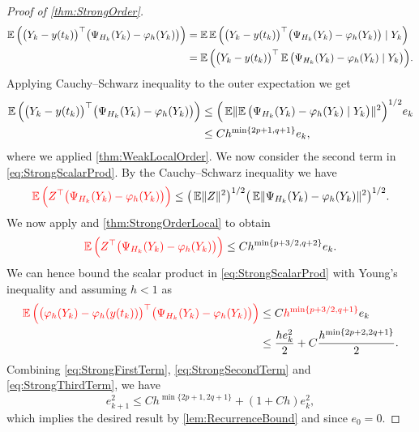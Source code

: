 \documentclass[10pt]{article}
\begin{document}
\begin{proof}[Proof of \cref{thm:StrongOrder}]
	\begin{equation}
	\begin{aligned}
		\operatorname{\mathbb{E}}\Big(\big(Y_k - y(t_k)\big)^\top \big(\Psi_{H_k}(Y_k) - \varphi_{h}(Y_k)\big)\Big) &= \operatorname{\mathbb{E}}\operatorname{\mathbb{E}}\Big(\big(Y_k - y(t_k)\big)^\top \big(\Psi_{H_k}(Y_k) - \varphi_{h}(Y_k)\big) \mid Y_k\Big)\\
		&= \operatorname{\mathbb{E}}\Big(\big(Y_k - y(t_k)\big)^\top\operatorname{\mathbb{E}} \big(\Psi_{H_k}(Y_k) - \varphi_{h}(Y_k) \mid Y_k \big)\Big).
	\end{aligned}
	\end{equation}
	Applying Cauchy--Schwarz inequality to the outer expectation we get
	\begin{equation}
	\begin{aligned}
		\operatorname{\mathbb{E}}\Big(\big(Y_k - y(t_k)\big)^\top \big(\Psi_{H_k}(Y_k) - \varphi_{h}(Y_k)\big)\Big) &\leq \Big(\operatorname{\mathbb{E}}\lVert\operatorname{\mathbb{E}}\big(\Psi_{H_k}(Y_k) - \varphi_{h}(Y_k) \mid Y_k\big)\rVert^{2}\Big)^{1/2}e_k  \\
		&\leq  Ch^{\min\{2p+1, q+1\}}e_k,
	\end{aligned}
	\end{equation}
	where we applied \cref{thm:WeakLocalOrder}. We now consider the second term in \eqref{eq:StrongScalarProd}. By the Cauchy--Schwarz inequality we have
	\begin{equation}
		{\color{red}\operatorname{\mathbb{E}}\Big(Z^\top \big(\Psi_{H_k}(Y_k) - \varphi_{h}(Y_k)\big)\Big)} \leq \big(\operatorname{\mathbb{E}}\lVert Z\rVert^{2}\big)^{1/2} \big(\operatorname{\mathbb{E}}\lVert\Psi_{H_k}(Y_k) - \varphi_{h}(Y_k)\rVert^2\big)^{1/2}.
	\end{equation}
	We now apply \corr{\eqref{eq:FlowLipschitzBoundRem}} and \cref{thm:StrongOrderLocal} to obtain
	\begin{equation}
		{\color{red}\operatorname{\mathbb{E}}\Big(Z^\top \big(\Psi_{H_k}(Y_k) - \varphi_{h}(Y_k)\big)\Big)} \leq C h^{\min\{p+3/2, q+2\}} e_k.
	\end{equation}
	We can hence bound the scalar product in \eqref{eq:StrongScalarProd} with Young's inequality and assuming $h < 1$ as
	\begin{equation}\label{eq:StrongThirdTerm}
	\begin{aligned}
		{\color{red}\operatorname{\mathbb{E}}\Big(\big(\varphi_{h}(Y_k) - \varphi_{h}(y(t_k))\big)^\top\big(\Psi_{H_k}(Y_k) - \varphi_{h}(Y_k)\big)\Big)} &\leq C {\color{red}h^{\min\{p+3/2, q+1\}}} e_k \\
		&\leq \frac{he_k^2}{2} + C\frac{h^{\min\{2p+2,2q+1\}}}{2}.
	\end{aligned}
	\end{equation}
	Combining \eqref{eq:StrongFirstTerm}, \eqref{eq:StrongSecondTerm} and \eqref{eq:StrongThirdTerm}, we have
	\begin{equation}
		e_{k+1}^2 \leq Ch^{\min\{2p+1, 2q+1\}} + (1 + Ch)e_k^2,
	\end{equation}
	which implies the desired result by \cref{lem:RecurrenceBound} and since $e_0 = 0$.
\end{proof}
\end{document}
